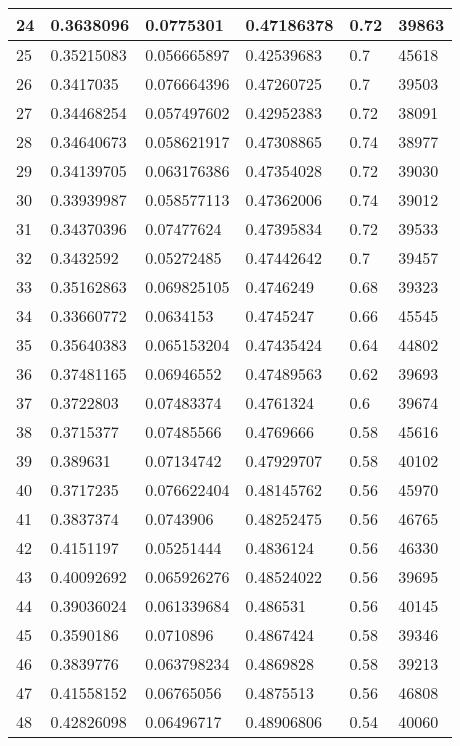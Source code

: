 \begin{longtable}{|l|l|l|l|l|l|}
24 & 0.3638096 & 0.0775301 & 0.47186378 & 0.72 & 39863 \\ \hline 
25 & 0.35215083 & 0.056665897 & 0.42539683 & 0.7 & 45618 \\ \hline 
26 & 0.3417035 & 0.076664396 & 0.47260725 & 0.7 & 39503 \\ \hline 
27 & 0.34468254 & 0.057497602 & 0.42952383 & 0.72 & 38091 \\ \hline 
28 & 0.34640673 & 0.058621917 & 0.47308865 & 0.74 & 38977 \\ \hline 
29 & 0.34139705 & 0.063176386 & 0.47354028 & 0.72 & 39030 \\ \hline 
30 & 0.33939987 & 0.058577113 & 0.47362006 & 0.74 & 39012 \\ \hline 
31 & 0.34370396 & 0.07477624 & 0.47395834 & 0.72 & 39533 \\ \hline 
32 & 0.3432592 & 0.05272485 & 0.47442642 & 0.7 & 39457 \\ \hline 
33 & 0.35162863 & 0.069825105 & 0.4746249 & 0.68 & 39323 \\ \hline 
34 & 0.33660772 & 0.0634153 & 0.4745247 & 0.66 & 45545 \\ \hline 
35 & 0.35640383 & 0.065153204 & 0.47435424 & 0.64 & 44802 \\ \hline 
36 & 0.37481165 & 0.06946552 & 0.47489563 & 0.62 & 39693 \\ \hline 
37 & 0.3722803 & 0.07483374 & 0.4761324 & 0.6 & 39674 \\ \hline 
38 & 0.3715377 & 0.07485566 & 0.4769666 & 0.58 & 45616 \\ \hline 
39 & 0.389631 & 0.07134742 & 0.47929707 & 0.58 & 40102 \\ \hline 
40 & 0.3717235 & 0.076622404 & 0.48145762 & 0.56 & 45970 \\ \hline 
41 & 0.3837374 & 0.0743906 & 0.48252475 & 0.56 & 46765 \\ \hline 
42 & 0.4151197 & 0.05251444 & 0.4836124 & 0.56 & 46330 \\ \hline 
43 & 0.40092692 & 0.065926276 & 0.48524022 & 0.56 & 39695 \\ \hline 
44 & 0.39036024 & 0.061339684 & 0.486531 & 0.56 & 40145 \\ \hline 
45 & 0.3590186 & 0.0710896 & 0.4867424 & 0.58 & 39346 \\ \hline 
46 & 0.3839776 & 0.063798234 & 0.4869828 & 0.58 & 39213 \\ \hline 
47 & 0.41558152 & 0.06765056 & 0.4875513 & 0.56 & 46808 \\ \hline 
48 & 0.42826098 & 0.06496717 & 0.48906806 & 0.54 & 40060 \\ \hline 

\end{longtable}

